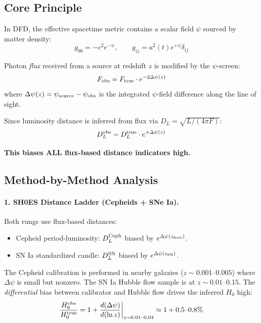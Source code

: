 \documentclass[11pt,a4paper]{article}
\newcounter{findingctr}
\newenvironment{finding}[1][]{%
  \refstepcounter{findingctr}%
  \begin{tcolorbox}[colback=blue!3!white, colframe=blue!50!black,
    title=\textbf{Finding \thefindingctr: #1}]
}{%
  \end{tcolorbox}%
}
\newcommand{\Dpsi}{\Delta\psi}
\begin{document}
\begin{finding}[\textbf{H0 HIERARCHY}: DFD Predicts Which Probes
  Are Biased and Which Are Not]
\label{find:H0}

\subsection*{Core Principle}

In DFD, the effective spacetime metric contains a scalar
field $\psi$ sourced by matter density:
\begin{equation}
g_{00} = -c^2 e^{-\psi}, \qquad g_{ij} = a^2(t) e^{+\psi} \delta_{ij}
\end{equation}

Photon \emph{flux} received from a source at redshift $z$
is modified by the $\psi$-screen:
\begin{equation}
F_{\rm obs} = F_{\rm true} \cdot e^{-2\Dpsi(z)}
\end{equation}
where $\Dpsi(z) = \psi_{\rm source} - \psi_{\rm obs}$ is the
integrated $\psi$-field difference along the line of sight.

Since luminosity distance is inferred from flux via
$D_L = \sqrt{L/(4\pi F)}$:
\begin{equation}
D_L^{\rm obs} = D_L^{\rm true} \cdot e^{+\Dpsi(z)}
\end{equation}

\textbf{This biases ALL flux-based distance indicators high.}

\subsection*{Method-by-Method Analysis}

\paragraph{1. SH0ES Distance Ladder (Cepheids + SNe Ia).}

Both rungs use flux-based distances:
\begin{itemize}[nosep]
\item Cepheid period-luminosity: $D_L^{\rm Ceph}$ biased
  by $e^{\Dpsi(z_{\rm host})}$.
\item SN Ia standardized candle: $D_L^{\rm SN}$ biased
  by $e^{\Dpsi(z_{\rm SN})}$.
\end{itemize}

The Cepheid calibration is performed in nearby galaxies
($z \sim 0.001$--$0.005$) where $\Dpsi$ is small but nonzero.
The SN Ia Hubble flow sample is at $z \sim 0.01$--$0.15$.
The \emph{differential} bias between calibrator and Hubble
flow drives the inferred $H_0$ high:
\begin{equation}
\frac{H_0^{\rm obs}}{H_0^{\rm true}} = 1 + \frac{d(\Dpsi)}{d(\ln z)}
\bigg|_{z \sim 0.01\text{--}0.04} \approx 1 + 0.5\text{--}0.8\%
\end{equation}


\end{finding}
\end{document}
